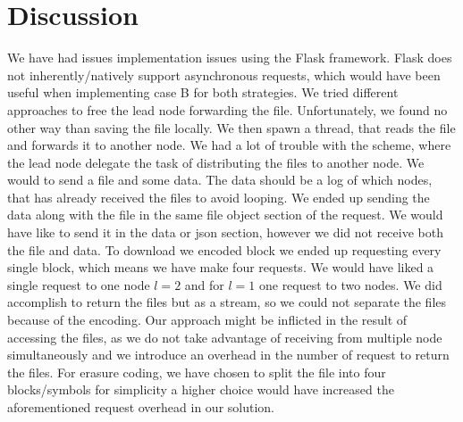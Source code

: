 \section{Discussion} \label{sec:dis}

We have had issues implementation issues using the Flask framework. 
Flask does not inherently/natively support asynchronous requests, which would have been useful when implementing case B for both strategies. We tried different approaches to free the lead node forwarding the file. Unfortunately, we found no other way than saving the file locally. We then spawn a thread, that reads the file and forwards it to another node.
We had a lot of trouble with the scheme, where the lead node delegate the task of distributing the files to another node. We would to send a file and some data. The data should be a log of which nodes, that has already received the files to avoid looping. We ended up sending the data along with the file in the same file object section of the request. We would have like to send it in the data or json section, however we did not receive both the file and data. 
To download we encoded block we ended up requesting every single block, which means we have make four requests. We would have liked a single request to one node $l=2$ and for $l=1$ one request to two nodes. We did accomplish to return the files but as a stream, so we could not separate the files because of the encoding. Our approach might be inflicted in the result of accessing the files, as we do not take advantage of receiving from multiple node simultaneously and we introduce an overhead in the number of request to return the files.
For erasure coding, we have chosen to split the file into four blocks/symbols for simplicity a higher choice would have increased the aforementioned request overhead in our solution. 
